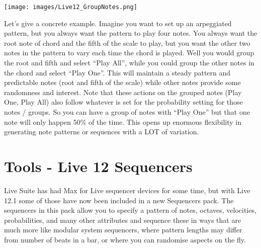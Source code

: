 \documentclass[
  12pt,
  letterpaper,
  oneside,
  open=any]{scrbook}
\begin{document}
\texttt{[image: images/Live12\_GroupNotes.png]}

Let's give a concrete example. Imagine you want to set up an arpeggiated
pattern, but you always want the pattern to play four notes. You always
want the root note of chord and the fifth of the scale to play, but you
want the other two notes in the pattern to vary each time the chord is
played. Well you would group the root and fifth and select ``Play All'',
while you could group the other notes in the chord and select ``Play
One''. This will maintain a steady pattern and predictable notes (root
and fifth of the scale) while other notes provide some randomness and
interest. Note that these actions on the grouped notes (Play One, Play
All) also follow whatever is set for the probability setting for those
notes / groups. So you can have a group of notes with ``Play One'' but
that one note will only happen 50\% of the time. This opens up enormous
flexibility in generating note patterns or sequences with a LOT of
variation.


\chapter{Tools - Live 12
Sequencers}\label{Chapter-031-Tools-Live12_Sequencers}

Live Suite has had Max for Live sequencer devices for some time, but
with Live 12.1 some of those have now been included in a new Sequencers
pack. The sequencers in this pack allow you to specify a pattern of
notes, octaves, velocities, probabilities, and many other attributes and
sequence these in ways that are much more like modular system
sequencers, where pattern lengths may differ from number of beats in a
bar, or where you can randomise aspects on the fly.
\end{document}
